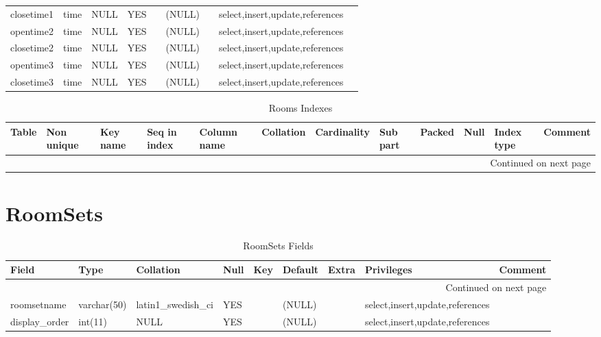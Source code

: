 \documentclass[tablesignature,landscape]{scrartcl}
\begin{document}
\begin{longtable}{|l|l|l|l|l|l|l|l|l|}
 closetime1        &  time          &  NULL                     &  YES   &       &  (NULL)   &                     &  select,insert,update,references  &           \\
 opentime2         &  time          &  NULL                     &  YES   &       &  (NULL)   &                     &  select,insert,update,references  &           \\
 closetime2        &  time          &  NULL                     &  YES   &       &  (NULL)   &                     &  select,insert,update,references  &           \\
 opentime3         &  time          &  NULL                     &  YES   &       &  (NULL)   &                     &  select,insert,update,references  &           \\
 closetime3        &  time          &  NULL                     &  YES   &       &  (NULL)   &                     &  select,insert,update,references  &           \\
\hline
\end{longtable}


\begin{longtable}{|l|l|l|l|l|l|l|l|l|l|l|l|}
\caption{Rooms Indexes} \label{tbl:roomsindexes}\\
\hline
 Table  &  Non unique  &  Key name  &  Seq in index  &  Column name  &  Collation  &  Cardinality  &  Sub part  &  Packed  &  Null  &  Index type  &  Comment \\
\hline
\endhead
\hline\multicolumn{12}{r}{Continued on next page}\
\endfoot
\endlastfoot
\hline
 Rooms  &           0  &  PRIMARY   &             1  &  roomid       &  A          &           38  &  (NULL)    &  (NULL)  &        &  BTREE       &           \\
\hline
\end{longtable}
\section{RoomSets}
\label{sec-23}


\begin{longtable}{|l|l|l|l|l|l|l|l|l|}
\caption{RoomSets Fields} \label{tbl:roomsetsfields}\\
\hline
 Field             &  Type         &  Collation                &  Null  &  Key  &  Default  &  Extra              &  Privileges                       &  Comment \\
\hline
\endhead
\hline\multicolumn{9}{r}{Continued on next page}\
\endfoot
\endlastfoot
\hline
 roomsetid         &  int(11)      &  NULL                     &        &  PRI  &  (NULL)   &  auto\_{}increment  &  select,insert,update,references  &           \\
 roomsetname       &  varchar(50)  &  latin1\_{}swedish\_{}ci  &  YES   &       &  (NULL)   &                     &  select,insert,update,references  &           \\
 display\_{}order  &  int(11)      &  NULL                     &  YES   &       &  (NULL)   &                     &  select,insert,update,references  &           \\
\hline
\end{longtable}
\end{document}
